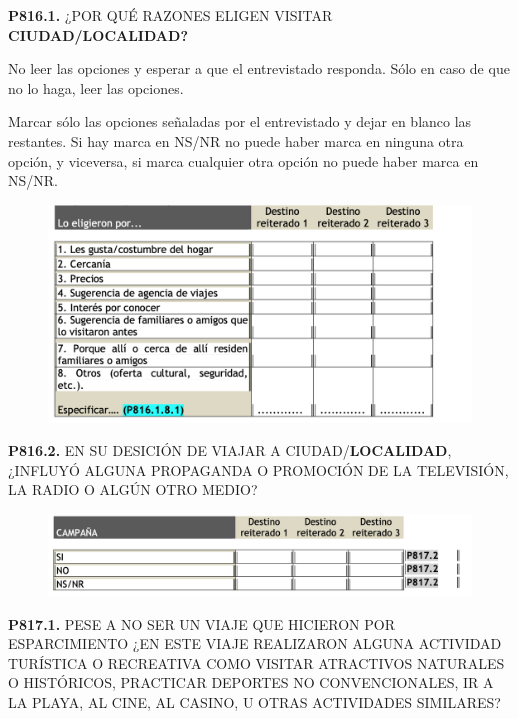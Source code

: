 \documentclass[
  openany]{book}
\begin{document}
\textbf{P816.1.} ¿POR QUÉ RAZONES ELIGEN VISITAR \textbf{CIUDAD/LOCALIDAD?}

No leer las opciones y esperar a que el entrevistado responda. Sólo en caso de que no lo haga, leer las opciones.

Marcar sólo las opciones señaladas por el entrevistado y dejar en blanco las restantes. Si hay marca en NS/NR no puede haber marca en ninguna otra opción, y viceversa, si marca cualquier otra opción no puede haber marca en NS/NR.

\begin{figure}

{\centering \includegraphics[width=1\linewidth]{imagenes/figura6-271} 

}

\end{figure}

\textbf{P816.2.} EN SU DESICIÓN DE VIAJAR A CIUDAD/\textbf{LOCALIDAD}, ¿INFLUYÓ ALGUNA PROPAGANDA O PROMOCIÓN DE LA TELEVISIÓN, LA RADIO O ALGÚN OTRO MEDIO?

\begin{figure}

{\centering \includegraphics[width=1\linewidth]{imagenes/figura6-272} 

}

\end{figure}

\textbf{P817.1.} PESE A NO SER UN VIAJE QUE HICIERON POR ESPARCIMIENTO ¿EN ESTE VIAJE REALIZARON ALGUNA ACTIVIDAD TURÍSTICA O RECREATIVA COMO VISITAR ATRACTIVOS NATURALES O HISTÓRICOS, PRACTICAR DEPORTES NO CONVENCIONALES, IR A LA PLAYA, AL CINE, AL CASINO, U OTRAS ACTIVIDADES SIMILARES?
\end{document}
